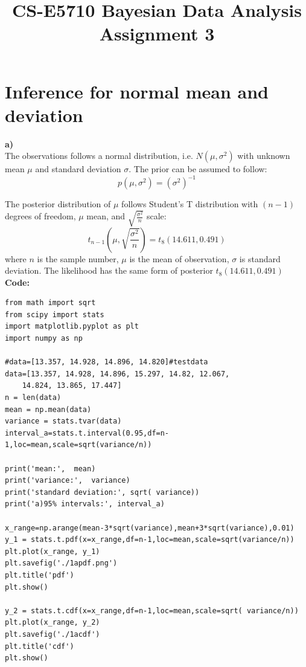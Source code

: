 \documentclass{article}
\begin{document}
\title{CS-E5710 Bayesian Data Analysis\\Assignment 3}                  
\maketitle



\section{Inference for normal mean and deviation}
\textbf{a)}\\
The observations follows a normal distribution, i.e. $N(\mu,\sigma^2)$ with unknown mean $\mu$ and standard deviation $\sigma$. The prior can be assumed to follow:
\begin{equation}
p(\mu,\sigma^2)=(\sigma^2)^{-1}
\end{equation}

The posterior distribution of $\mu$ follows Student's T distribution with $(n-1)$degrees of freedom, $\mu$ mean, and $\sqrt{\frac{\sigma^2}{n}}$ scale:
\begin{equation}
t_{n-1}(\mu, \sqrt{\frac{\sigma^2}{n}})=t_8(14.611, 0.491)
\end{equation}
where $n$ is the sample number, $\mu$ is the mean of observation, $\sigma$ is standard deviation.
The likelihood has the same form of posterior $t_8(14.611, 0.491)$\\
\textbf{Code:}
\begin{verbatim}  
from math import sqrt
from scipy import stats
import matplotlib.pyplot as plt
import numpy as np

#data=[13.357, 14.928, 14.896, 14.820]#testdata
data=[13.357, 14.928, 14.896, 15.297, 14.82, 12.067, 
	14.824, 13.865, 17.447]
n = len(data)
mean = np.mean(data)
variance = stats.tvar(data)
interval_a=stats.t.interval(0.95,df=n-1,loc=mean,scale=sqrt(variance/n))

print('mean:',  mean)
print('variance:',  variance)
print('standard deviation:', sqrt( variance))
print('a)95% intervals:', interval_a)

x_range=np.arange(mean-3*sqrt(variance),mean+3*sqrt(variance),0.01)
y_1 = stats.t.pdf(x=x_range,df=n-1,loc=mean,scale=sqrt(variance/n))
plt.plot(x_range, y_1)
plt.savefig('./1apdf.png')
plt.title('pdf')
plt.show() 

y_2 = stats.t.cdf(x=x_range,df=n-1,loc=mean,scale=sqrt( variance/n)) 
plt.plot(x_range, y_2)
plt.savefig('./1acdf')
plt.title('cdf')
plt.show()
\end{verbatim}
 
\end{document}
